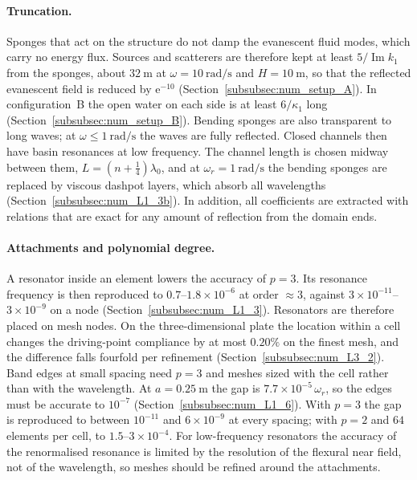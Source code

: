 {\paragraph{Truncation.} Sponges that act on the structure do not damp the evanescent fluid modes, which carry no energy flux. Sources and scatterers are therefore kept at least $5/\operatorname{Im}k_1$ from the sponges, about $32~\si{\meter}$ at $\omega=10~\si{\radian\per\second}$ and $H=10~\si{\meter}$, so that the reflected evanescent field is reduced by $\mathrm{e}^{-10}$ (Section~\ref{subsubsec:num_setup_A}). In configuration~B the open water on each side is at least $6/\kappa_1$ long (Section~\ref{subsubsec:num_setup_B}). Bending sponges are also transparent to long waves; at $\omega\le1~\si{\radian\per\second}$ the waves are fully reflected. Closed channels then have basin resonances at low frequency. The channel length is chosen midway between them, $L=(n+\tfrac14)\lambda_0$, and at $\omega_r=1~\si{\radian\per\second}$ the bending sponges are replaced by viscous dashpot layers, which absorb all wavelengths (Section~\ref{subsubsec:num_L1_3b}). In addition, all coefficients are extracted with relations that are exact for any amount of reflection from the domain ends.

\paragraph{Attachments and polynomial degree.} A resonator inside an element lowers the accuracy of $p=3$. Its resonance frequency is then reproduced to $0.7$--$1.8\times10^{-6}$ at order $\approx3$, against $3\times10^{-11}$--$3\times10^{-9}$ on a node (Section~\ref{subsubsec:num_L1_3}). Resonators are therefore placed on mesh nodes. On the three-dimensional plate the location within a cell changes the driving-point compliance by at most $0.20\%$ on the finest mesh, and the difference falls fourfold per refinement (Section~\ref{subsubsec:num_L3_2}). Band edges at small spacing need $p=3$ and meshes sized with the cell rather than with the wavelength. At $a=0.25~\si{\meter}$ the gap is $7.7\times10^{-5}\,\omega_r$, so the edges must be accurate to $10^{-7}$ (Section~\ref{subsubsec:num_L1_6}). With $p=3$ the gap is reproduced to between $10^{-11}$ and $6\times10^{-9}$ at every spacing; with $p=2$ and $64$ elements per cell, to $1.5$--$3\times10^{-4}$. For low-frequency resonators the accuracy of the renormalised resonance is limited by the resolution of the flexural near field, not of the wavelength, so meshes should be refined around the attachments.

}
